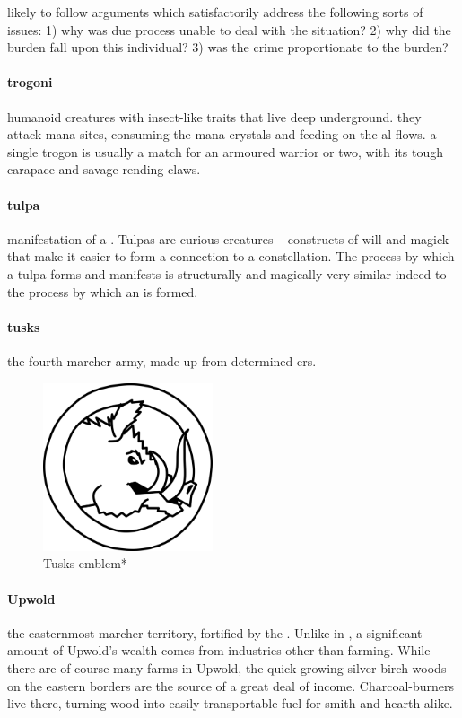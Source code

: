 likely to follow arguments which satisfactorily address the following sorts of issues: 1) why was due process unable to deal with the situation? 2) why did the burden fall upon this individual? 3) was the crime proportionate to the burden? 
\bigparagraphendtwiddle
\paragraph{trogoni} humanoid creatures with insect-like traits that live deep underground. they attack mana sites, consuming the mana crystals and feeding on the al flows. a single trogon is usually a match for an armoured warrior or two, with its tough carapace and savage rending claws.
\paragraph{tulpa} manifestation of a . Tulpas are curious creatures – constructs of will and magick that make it easier to form a connection to a constellation. The process by which a tulpa forms and manifests is structurally and magically very similar indeed to the process by which an  is formed.
\paragraph{tusks} the fourth marcher army, made up from determined ers.  \begin{figure}\centering\includegraphics[width=5cm]{encyclopedia/Tusks}\caption{Tusks emblem*}\end{figure}
\paragraph{Upwold} the easternmost marcher territory, fortified by the . Unlike in , a significant amount of Upwold's wealth comes from industries other than farming. While there are of course many farms in Upwold, the quick-growing silver birch woods on the eastern borders are the source of a great deal of income. Charcoal-burners live there, turning wood into easily transportable fuel for smith and hearth alike.
